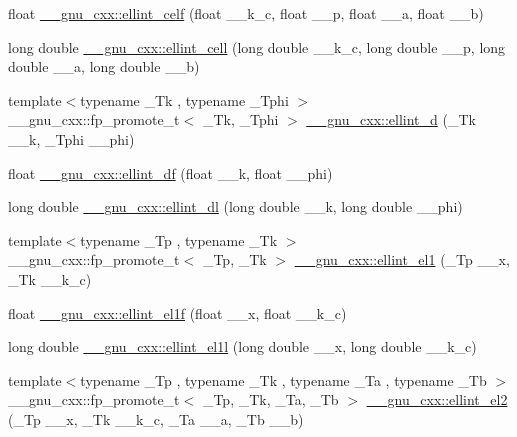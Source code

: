 \begin{DoxyCompactItemize}
float \hyperlink{group__gnu__math__spec__func_ga6d8fbef7853cf37de11278b1ff7127e8}{\+\_\+\+\_\+gnu\+\_\+cxx\+::ellint\+\_\+celf} (float \+\_\+\+\_\+k\+\_\+c, float \+\_\+\+\_\+p, float \+\_\+\+\_\+a, float \+\_\+\+\_\+b)
\item 
long double \hyperlink{group__gnu__math__spec__func_gaa5add699fb2b4b02e63f8725a3a79750}{\+\_\+\+\_\+gnu\+\_\+cxx\+::ellint\+\_\+cell} (long double \+\_\+\+\_\+k\+\_\+c, long double \+\_\+\+\_\+p, long double \+\_\+\+\_\+a, long double \+\_\+\+\_\+b)
\item 
{\footnotesize template$<$typename \+\_\+\+Tk , typename \+\_\+\+Tphi $>$ }\\\+\_\+\+\_\+gnu\+\_\+cxx\+::fp\+\_\+promote\+\_\+t$<$ \+\_\+\+Tk, \+\_\+\+Tphi $>$ \hyperlink{group__gnu__math__spec__func_gad75103894786e6d7766bac4d8447b6cc}{\+\_\+\+\_\+gnu\+\_\+cxx\+::ellint\+\_\+d} (\+\_\+\+Tk \+\_\+\+\_\+k, \+\_\+\+Tphi \+\_\+\+\_\+phi)
\item 
float \hyperlink{group__gnu__math__spec__func_ga02ed50be21fdd84ad6bed003f94a9e69}{\+\_\+\+\_\+gnu\+\_\+cxx\+::ellint\+\_\+df} (float \+\_\+\+\_\+k, float \+\_\+\+\_\+phi)
\item 
long double \hyperlink{group__gnu__math__spec__func_gaa34bcb8e316f2e8b2b2bf48cd89abd98}{\+\_\+\+\_\+gnu\+\_\+cxx\+::ellint\+\_\+dl} (long double \+\_\+\+\_\+k, long double \+\_\+\+\_\+phi)
\item 
{\footnotesize template$<$typename \+\_\+\+Tp , typename \+\_\+\+Tk $>$ }\\\+\_\+\+\_\+gnu\+\_\+cxx\+::fp\+\_\+promote\+\_\+t$<$ \+\_\+\+Tp, \+\_\+\+Tk $>$ \hyperlink{group__gnu__math__spec__func_ga510b1e51e7d3bc937ed1b4c2f57492e4}{\+\_\+\+\_\+gnu\+\_\+cxx\+::ellint\+\_\+el1} (\+\_\+\+Tp \+\_\+\+\_\+x, \+\_\+\+Tk \+\_\+\+\_\+k\+\_\+c)
\item 
float \hyperlink{group__gnu__math__spec__func_ga8d8342bb4f42c7fe09b5589c54d4e713}{\+\_\+\+\_\+gnu\+\_\+cxx\+::ellint\+\_\+el1f} (float \+\_\+\+\_\+x, float \+\_\+\+\_\+k\+\_\+c)
\item 
long double \hyperlink{group__gnu__math__spec__func_gaeed1201e421be410460739048cba5cd8}{\+\_\+\+\_\+gnu\+\_\+cxx\+::ellint\+\_\+el1l} (long double \+\_\+\+\_\+x, long double \+\_\+\+\_\+k\+\_\+c)
\item 
{\footnotesize template$<$typename \+\_\+\+Tp , typename \+\_\+\+Tk , typename \+\_\+\+Ta , typename \+\_\+\+Tb $>$ }\\\+\_\+\+\_\+gnu\+\_\+cxx\+::fp\+\_\+promote\+\_\+t$<$ \+\_\+\+Tp, \+\_\+\+Tk, \+\_\+\+Ta, \+\_\+\+Tb $>$ \hyperlink{group__gnu__math__spec__func_ga6230131ce5679e0936a16a6b029d6342}{\+\_\+\+\_\+gnu\+\_\+cxx\+::ellint\+\_\+el2} (\+\_\+\+Tp \+\_\+\+\_\+x, \+\_\+\+Tk \+\_\+\+\_\+k\+\_\+c, \+\_\+\+Ta \+\_\+\+\_\+a, \+\_\+\+Tb \+\_\+\+\_\+b)

\end{DoxyCompactItemize}
